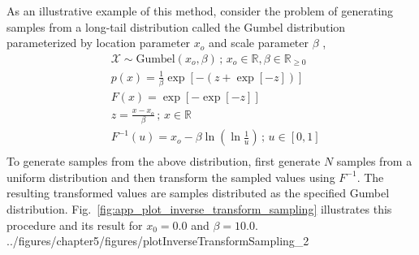 As an illustrative example of this method, consider the problem of generating samples from a long-tail distribution called the Gumbel distribution parameterized by location parameter $x_o$ and scale parameter $\beta$ \cite{Oliveira2014},
\begin{equation}
	\begin{split}
		& \mathcal{X} \sim \text{Gumbel}(x_o, \beta) \, ; \, x_o \in \mathbb{R}, \beta \in \mathbb{R}_{\geq 0} \\
		& p(x) = \frac{1}{\beta} \exp{\left[-(z + \exp{[-z]})\right]}\\
		& F(x) = \exp{[-\exp{[-z]}]} \\
		& z = \frac{x - x_o}{\beta} \, ; \, x \in \mathbb{R} \\
		& F^{-1}(u) = x_o - \beta\ln{(\ln{\frac{1}{u}})} \, ; \, u \in [0,1] \\
	\end{split}
\label{eq:app_gumbel_distribution}
\end{equation}
To generate samples from the above distribution, first generate $N$ samples from a uniform distribution and then transform the sampled values using $F^{-1}$.
The resulting transformed values are samples distributed as the specified Gumbel distribution.
Fig.~\ref{fig:app_plot_inverse_transform_sampling} illustrates this procedure and its result for $x_0 = 0.0$ and $\beta = 10.0$. 
{../figures/chapter5/figures/plotInverseTransformSampling_2}

 